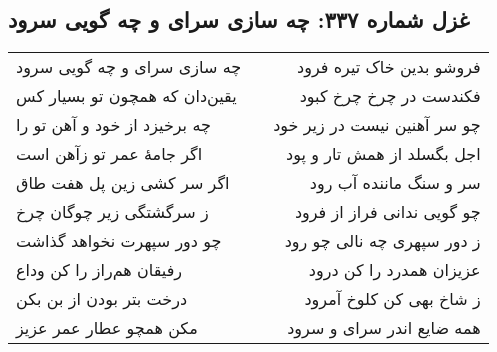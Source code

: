 \begin{center}
\section*{غزل شماره ۳۳۷: چه سازی سرای و چه گویی سرود}
\label{sec:337}
\begin{longtable}{l p{0.5cm} r}
چه سازی سرای و چه گویی سرود
&&
فروشو بدین خاک تیره فرود
\\
یقین‌دان که همچون تو بسیار کس
&&
فکندست در چرخ چرخ کبود
\\
چه برخیزد از خود و آهن تو را
&&
چو سر آهنین نیست در زیر خود
\\
اگر جامهٔ عمر تو زآهن است
&&
اجل بگسلد از همش تار و پود
\\
اگر سر کشی زین پل هفت طاق
&&
سر و سنگ ماننده آب رود
\\
ز سرگشتگی زیر چوگان چرخ
&&
چو گویی ندانی فراز از فرود
\\
چو دور سپهرت نخواهد گذاشت
&&
ز دور سپهری چه نالی چو رود
\\
رفیقان هم‌راز را کن وداع
&&
عزیزان همدرد را کن درود
\\
درخت بتر بودن از بن بکن
&&
ز شاخ بهی کن کلوخ آمرود
\\
مکن همچو عطار عمر عزیز
&&
همه ضایع اندر سرای و سرود
\\
\end{longtable}
\end{center}
